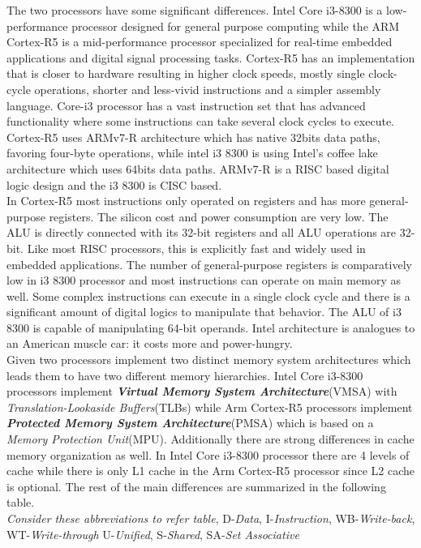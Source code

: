 \documentclass[a4paper,11pt]{article}
\begin{document}
The two processors have some significant differences. Intel Core i3-8300 is a low-performance processor designed for general purpose computing while the ARM Cortex-R5 is a mid-performance processor specialized for real-time embedded applications and digital signal processing tasks. Cortex-R5 has an implementation that is closer to hardware resulting in higher clock speeds, mostly single clock-cycle operations, shorter and less-vivid instructions and a simpler assembly language. Core-i3 processor has a vast instruction set that has advanced functionality where some instructions can take several clock cycles to execute. Cortex-R5 uses ARMv7-R architecture which has native 32bits data paths, favoring four-byte operations, while intel i3 8300 is using Intel’s coffee lake architecture which uses 64bits data paths. ARMv7-R is a RISC based digital logic design and the i3 8300 is CISC based.\\
In Cortex-R5 most instructions only operated on registers and has more general-purpose registers. The silicon cost and power consumption are very low. The ALU is directly connected with its 32-bit registers and all ALU operations are 32-bit. Like most RISC processors, this is explicitly fast and widely used in embedded applications. The number of general-purpose registers is comparatively low in i3 8300 processor and most instructions can operate on main memory as well. Some complex instructions can execute in a single clock cycle and there is a significant amount of digital logics to manipulate that behavior. The ALU of i3 8300 is capable of manipulating 64-bit operands. Intel architecture is analogues to an American muscle car: it costs more and power-hungry.\\
Given two processors implement two distinct memory system architectures which leads them to have two different memory hierarchies. Intel Core i3-8300 processors implement \textit{\textbf{Virtual Memory System Architecture}}(VMSA) with \textit{Translation-Lookaside Buffers}(TLBs) while Arm Cortex-R5 processors implement \textit{\textbf{Protected Memory System Architecture}}(PMSA) which is based on a \textit{Memory Protection Unit}(MPU). Additionally there are strong differences in cache memory organization as well. In Intel Core i3-8300 processor there are 4 levels of cache while there is only L1 cache  in the Arm Cortex-R5 processor since L2 cache is optional. The rest of the main differences are summarized in the following table.\\ 

{\footnotesize \textit{Consider these abbreviations to refer table},
	D-\textit{Data}, I-\textit{Instruction}, WB-\textit{Write-back}, WT-\textit{Write-through} U-\textit{Unified}, S-\textit{Shared}, SA-\textit{Set Associative}}\\
\end{document}
